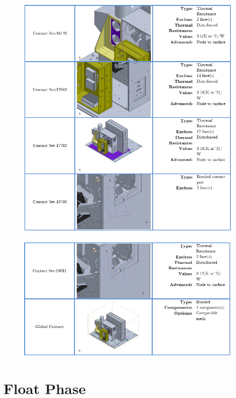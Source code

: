 \begin{figure}
    \centering
    \includegraphics[width=\textwidth]{thermal_load_images/ascent_pt2_TL_images/ascesnt_pt2_13.PNG}
\end{figure}

\begin{figure}
    \centering
    \includegraphics[width=\textwidth]{thermal_load_images/ascent_pt2_TL_images/ascesnt_pt2_14.PNG}
\end{figure}

\section{Float Phase}

